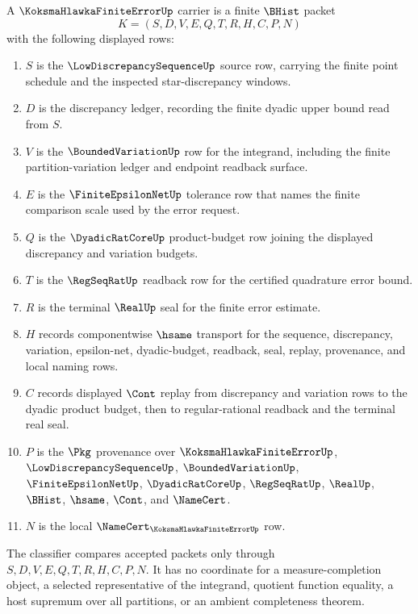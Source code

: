 \begin{definition}
\label{def:koksma-hlawka-finite-error-carrier}
A $\KoksmaHlawkaFiniteErrorUp$ carrier is a finite $\BHist$ packet
$$
K=(S,D,V,E,Q,T,R,H,C,P,N)
$$
with the following displayed rows:
\begin{enumerate}
\item $S$ is the $\LowDiscrepancySequenceUp$ source row, carrying the finite point schedule and the inspected star-discrepancy windows.
\item $D$ is the discrepancy ledger, recording the finite dyadic upper bound read from $S$.
\item $V$ is the $\BoundedVariationUp$ row for the integrand, including the finite partition-variation ledger and endpoint readback surface.
\item $E$ is the $\FiniteEpsilonNetUp$ tolerance row that names the finite comparison scale used by the error request.
\item $Q$ is the $\DyadicRatCoreUp$ product-budget row joining the displayed discrepancy and variation budgets.
\item $T$ is the $\RegSeqRatUp$ readback row for the certified quadrature error bound.
\item $R$ is the terminal $\RealUp$ seal for the finite error estimate.
\item $H$ records componentwise $\hsame$ transport for the sequence, discrepancy, variation, epsilon-net, dyadic-budget, readback, seal, replay, provenance, and local naming rows.
\item $C$ records displayed $\Cont$ replay from discrepancy and variation rows to the dyadic product budget, then to regular-rational readback and the terminal real seal.
\item $P$ is the $\Pkg$ provenance over $\KoksmaHlawkaFiniteErrorUp$, $\LowDiscrepancySequenceUp$, $\BoundedVariationUp$, $\FiniteEpsilonNetUp$, $\DyadicRatCoreUp$, $\RegSeqRatUp$, $\RealUp$, $\BHist$, $\hsame$, $\Cont$, and $\NameCert$.
\item $N$ is the local $\NameCert_{\KoksmaHlawkaFiniteErrorUp}$ row.
\end{enumerate}
The classifier compares accepted packets only through $S,D,V,E,Q,T,R,H,C,P,N$. It has no coordinate for a measure-completion object, a selected representative of the integrand, quotient function equality, a host supremum over all partitions, or an ambient completeness theorem.
\end{definition}

